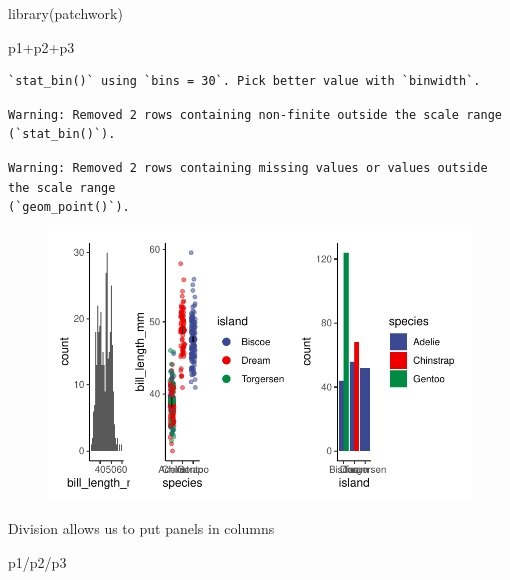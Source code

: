 \documentclass[
  letterpaper,
  DIV=11,
  numbers=noendperiod]{scrartcl}
\newenvironment{Shaded}{\begin{snugshade}}{\end{snugshade}}
\newcommand{\FunctionTok}[1]{\textcolor[rgb]{0.28,0.35,0.67}{#1}}
\newcommand{\NormalTok}[1]{\textcolor[rgb]{0.00,0.23,0.31}{#1}}
\newcommand{\SpecialCharTok}[1]{\textcolor[rgb]{0.37,0.37,0.37}{#1}}
\begin{document}
\begin{Shaded}
\begin{Highlighting}[]
\FunctionTok{library}\NormalTok{(patchwork)}

\NormalTok{p1}\SpecialCharTok{+}\NormalTok{p2}\SpecialCharTok{+}\NormalTok{p3}
\end{Highlighting}
\end{Shaded}

\begin{verbatim}
`stat_bin()` using `bins = 30`. Pick better value with `binwidth`.
\end{verbatim}

\begin{verbatim}
Warning: Removed 2 rows containing non-finite outside the scale range
(`stat_bin()`).
\end{verbatim}

\begin{verbatim}
Warning: Removed 2 rows containing missing values or values outside the scale range
(`geom_point()`).
\end{verbatim}

\begin{figure}[H]

{\centering \includegraphics{Lab_2_files/figure-pdf/unnamed-chunk-38-1.pdf}

}

\end{figure}

Division allows us to put panels in columns

\begin{Shaded}
\begin{Highlighting}[]
\NormalTok{p1}\SpecialCharTok{/}\NormalTok{p2}\SpecialCharTok{/}\NormalTok{p3}
\end{Highlighting}
\end{Shaded}
\end{document}
